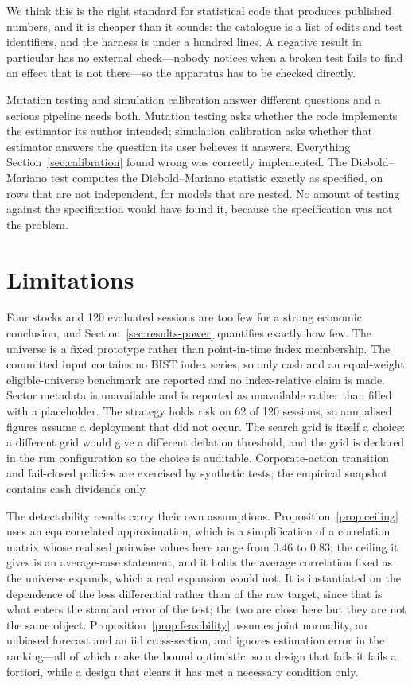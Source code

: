 \documentclass{article}
\theoremstyle{plain}
\theoremstyle{remark}
\begin{document}
We think this is the right standard for statistical code that produces published
numbers, and it is cheaper than it sounds: the catalogue is a list of edits and
test identifiers, and the harness is under a hundred lines. A negative result in
particular has no external check---nobody notices when a broken test fails to
find an effect that is not there---so the apparatus has to be checked directly.

Mutation testing and simulation calibration answer different questions and a
serious pipeline needs both. Mutation testing asks whether the code implements
the estimator its author intended; simulation calibration asks whether that
estimator answers the question its user believes it answers. Everything
Section~\ref{sec:calibration} found wrong was correctly implemented. The
Diebold--Mariano test computes the Diebold--Mariano statistic exactly as
specified, on rows that are not independent, for models that are nested. No
amount of testing against the specification would have found it, because the
specification was not the problem.

\section{Limitations}

Four stocks and 120 evaluated sessions are too few for a strong economic
conclusion, and Section~\ref{sec:results-power} quantifies exactly how few. The
universe is a fixed prototype rather than point-in-time index membership. The
committed input contains no BIST index series, so only cash and an equal-weight
eligible-universe benchmark are reported and no index-relative claim is made.
Sector metadata is unavailable and is reported as unavailable rather than filled
with a placeholder. The strategy holds risk on 62 of 120 sessions, so annualised
figures assume a deployment that did not occur. The search grid is itself a
choice: a different grid would give a different deflation threshold, and the grid
is declared in the run configuration so the choice is auditable.
Corporate-action transition and fail-closed policies are exercised by synthetic
tests; the empirical snapshot contains cash dividends only.

The detectability results carry their own assumptions.
Proposition~\ref{prop:ceiling} uses an equicorrelated approximation, which is a
simplification of a correlation matrix whose realised pairwise values here range
from $0.46$ to $0.83$; the ceiling it gives is an average-case statement, and it
holds the average correlation fixed as the universe expands, which a real
expansion would not. It is instantiated on the dependence of the loss
differential rather than of the raw target, since that is what enters the
standard error of the test; the two are close here but they are not the same
object. Proposition~\ref{prop:feasibility} assumes joint normality, an unbiased
forecast and an iid cross-section, and ignores estimation error in the
ranking---all of which make the bound optimistic, so a design that fails it fails
a fortiori, while a design that clears it has met a necessary condition only.
\end{document}
